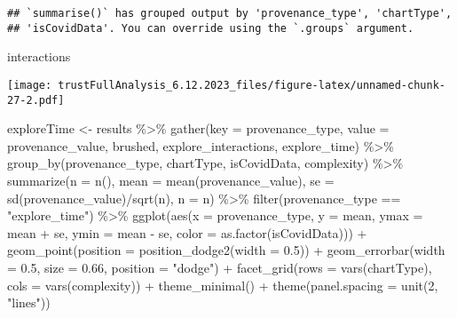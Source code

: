 \documentclass[
]{article}
\newenvironment{Shaded}{\begin{snugshade}}{\end{snugshade}}
\newcommand{\AttributeTok}[1]{\textcolor[rgb]{0.77,0.63,0.00}{#1}}
\newcommand{\DecValTok}[1]{\textcolor[rgb]{0.00,0.00,0.81}{#1}}
\newcommand{\FloatTok}[1]{\textcolor[rgb]{0.00,0.00,0.81}{#1}}
\newcommand{\FunctionTok}[1]{\textcolor[rgb]{0.00,0.00,0.00}{#1}}
\newcommand{\NormalTok}[1]{#1}
\newcommand{\OtherTok}[1]{\textcolor[rgb]{0.56,0.35,0.01}{#1}}
\newcommand{\SpecialCharTok}[1]{\textcolor[rgb]{0.00,0.00,0.00}{#1}}
\newcommand{\StringTok}[1]{\textcolor[rgb]{0.31,0.60,0.02}{#1}}
\begin{document}
\begin{verbatim}
## `summarise()` has grouped output by 'provenance_type', 'chartType',
## 'isCovidData'. You can override using the `.groups` argument.
\end{verbatim}

\begin{Shaded}
\begin{Highlighting}[]
\NormalTok{interactions}
\end{Highlighting}
\end{Shaded}

\texttt{[image: trustFullAnalysis\_6.12.2023\_files/figure-latex/unnamed-chunk-27-2.pdf]}

\begin{Shaded}
\begin{Highlighting}[]
\NormalTok{exploreTime }\OtherTok{\textless{}{-}}\NormalTok{ results }\SpecialCharTok{\%\textgreater{}\%}
  \FunctionTok{gather}\NormalTok{(}\AttributeTok{key =}\NormalTok{ provenance\_type, }\AttributeTok{value =}\NormalTok{ provenance\_value, brushed, explore\_interactions, explore\_time) }\SpecialCharTok{\%\textgreater{}\%}
  \FunctionTok{group\_by}\NormalTok{(provenance\_type, chartType, isCovidData, complexity) }\SpecialCharTok{\%\textgreater{}\%}
  \FunctionTok{summarize}\NormalTok{(}\AttributeTok{n =} \FunctionTok{n}\NormalTok{(), }
            \AttributeTok{mean =} \FunctionTok{mean}\NormalTok{(provenance\_value), }
            \AttributeTok{se =} \FunctionTok{sd}\NormalTok{(provenance\_value)}\SpecialCharTok{/}\FunctionTok{sqrt}\NormalTok{(n),}
            \AttributeTok{n =}\NormalTok{ n) }\SpecialCharTok{\%\textgreater{}\%}
  \FunctionTok{filter}\NormalTok{(provenance\_type }\SpecialCharTok{==} \StringTok{"explore\_time"}\NormalTok{) }\SpecialCharTok{\%\textgreater{}\%}
  \FunctionTok{ggplot}\NormalTok{(}\FunctionTok{aes}\NormalTok{(}\AttributeTok{x =}\NormalTok{ provenance\_type, }\AttributeTok{y =}\NormalTok{ mean, }\AttributeTok{ymax =}\NormalTok{ mean }\SpecialCharTok{+}\NormalTok{ se, }\AttributeTok{ymin =}\NormalTok{ mean }\SpecialCharTok{{-}}\NormalTok{ se, }\AttributeTok{color =} \FunctionTok{as.factor}\NormalTok{(isCovidData))) }\SpecialCharTok{+}
  \FunctionTok{geom\_point}\NormalTok{(}\AttributeTok{position =} \FunctionTok{position\_dodge2}\NormalTok{(}\AttributeTok{width =} \FloatTok{0.5}\NormalTok{)) }\SpecialCharTok{+}
  \FunctionTok{geom\_errorbar}\NormalTok{(}\AttributeTok{width =} \FloatTok{0.5}\NormalTok{, }\AttributeTok{size =} \FloatTok{0.66}\NormalTok{, }\AttributeTok{position =} \StringTok{"dodge"}\NormalTok{) }\SpecialCharTok{+}
  \FunctionTok{facet\_grid}\NormalTok{(}\AttributeTok{rows =} \FunctionTok{vars}\NormalTok{(chartType), }\AttributeTok{cols =} \FunctionTok{vars}\NormalTok{(complexity)) }\SpecialCharTok{+} 
  \FunctionTok{theme\_minimal}\NormalTok{() }\SpecialCharTok{+}
  \FunctionTok{theme}\NormalTok{(}\AttributeTok{panel.spacing =} \FunctionTok{unit}\NormalTok{(}\DecValTok{2}\NormalTok{, }\StringTok{"lines"}\NormalTok{))}
\end{Highlighting}
\end{Shaded}
\end{document}
